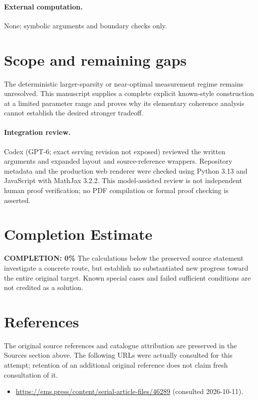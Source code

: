 \documentclass[11pt]{article}
\begin{document}
\paragraph{External computation.} None; symbolic arguments and boundary checks only.
\section{Scope and remaining gaps}
The deterministic larger-sparsity or near-optimal measurement regime remains unresolved. This manuscript supplies a complete explicit known-style construction at a limited parameter range and proves why its elementary coherence analysis cannot establish the desired stronger tradeoff.
\paragraph{Integration review.} Codex (GPT-6; exact serving revision not exposed) reviewed the written arguments and expanded layout and source-reference wrappers. Repository metadata and the production web renderer were checked using Python 3.13 and JavaScript with MathJax 3.2.2. This model-assisted review is not independent human proof verification; no PDF compilation or formal proof checking is asserted.

\section{Completion Estimate}
\noindent\textbf{COMPLETION: 0\%}
The calculations below the preserved source statement investigate a concrete route,
but establish no substantiated new progress toward the entire original target.
Known special cases and failed sufficient conditions are not credited as a solution.
\section{References}
The original source references and catalogue attribution are preserved in the
Sources section above. The following URLs were actually consulted for this attempt;
retention of an additional original reference does not claim fresh consultation of it.
\begin{itemize}
\item \url{https://ems.press/content/serial-article-files/46289} (consulted 2026-10-11). 
\end{itemize}
\end{document}
